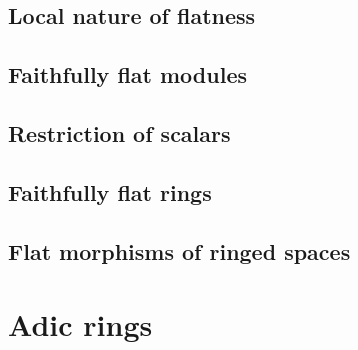 \documentclass{book}
\begin{document}
        \label{0-prelim-6.2}

        



        \subsection{Local nature of flatness}

        \label{0-prelim-6.3}

        



        \subsection{Faithfully flat modules}

        \label{0-prelim-6.4}

        



        \subsection{Restriction of scalars}

        \label{0-prelim-6.5}

        



        \subsection{Faithfully flat rings}

        \label{0-prelim-6.6}

        



        \subsection{Flat morphisms of ringed spaces}

        \label{0-prelim-6.7}

        



    \section{Adic rings}
\end{document}
